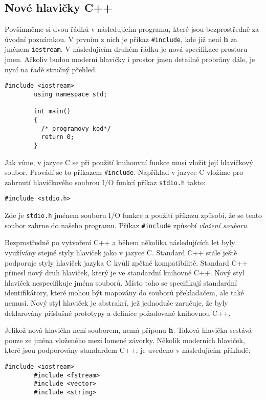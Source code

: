     \subsection{Nové hlavičky C++}
      Povšimněme si dvou řádků v následujícím programu, které jsou bezprostředně za úvodní
      poznámkou. V prvním z nich je přikaz \lstinline[style=luaCPPText]!#include!, kde již není
      \textbf{h} za jménem \lstinline[style=luaCPPText]!iostream!. V následujícím druhém řádku je
      nová specifikace prostoru jmen. Ačkoliv budou moderní hlavičky i prostor jmen detailně
      probrány dále, je nyní na řadě stručný přehled. 
      \begin{lstlisting}[style=luaCPPStyle]
        #include <iostream>
        using namespace std;

        int main()
        {
          /* programovy kod*/
          return 0;
        }
      \end{lstlisting}
      
      Jak víme, v jazyce C se při použití knihonvní funkce musí vložit její hlavičkový soubor.
      Provádí se to příkazem  \lstinline[style=luaCPPText]!#include!. Například v jazyce C vložíme
      pro zahrnutí hlavičkového soubrou I/O funkcí příkaz \lstinline[style=luaCPPText]!stdio.h!
      takto: 
      \begin{lstlisting}[style=luaCPPStyle]
        #include <stdio.h>
      \end{lstlisting}
      Zde je \lstinline[style=luaCPPText]!stdio.h! jménem souboru I/O funkce a použití příkazu
      způsobí, že se tento soubor zahrne do našeho programu. Příkaz
      \lstinline[style=luaCPPText]!#include! způsobí \emph{vložení souboru}.

      Bezprostředně po vytvoření C++ a během několika následujících let byly využívány stejné styly
      hlaviček jako v jazyce C. Standard C++ stále ještě podporuje styly hlaviček jazyka C kvůli
      zpětné kompatibilitě. Standard C++ přinesl nový druh hlaviček, který je ve standardní
      knihovně C++. Nový styl hlaviček nespecifikuje jména souborů. Místo toho se specifikují
      standardní identifikátory, které mohou být mapovány do souborů překladačem, ale také nemusí.
      Nový styl hlaviček je abstrakcí, jež jednoduše zaručuje, že byly deklarovány příslušné
      prototypy a definice požadované knihovnou C++.

      Jelikož nová hlavička není souborem, nemá příponu \textbf{h}. Taková hlavička sestává pouze ze
      jména vloženého mezi lomené závorky. Několik moderních hlaviček, které jsou podporovány
      standardem C++, je uvedeno v následujícím příkladě:
      \begin{lstlisting}[style=luaCPPStyle]
        #include <iostream>
        #include <fstream>
        #include <vector>
        #include <string>
      \end{lstlisting}

